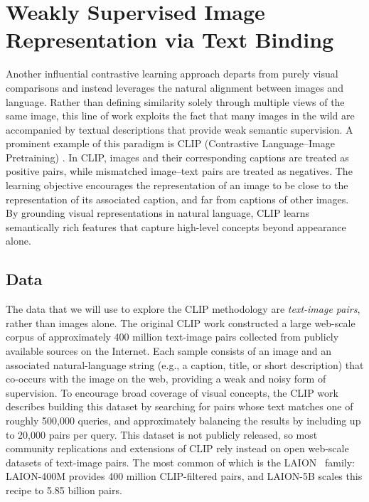 \documentclass[../../book-main.tex]{subfiles}
\begin{document}
\section{Weakly Supervised Image Representation via Text
Binding}\label{sec:CLIP}

Another influential contrastive learning approach departs from purely
visual comparisons and instead leverages the natural alignment
between images and language. Rather than defining similarity solely
through multiple views of the same image, this line of work exploits
the fact that many images in the wild are accompanied by textual
descriptions that provide weak semantic supervision. A prominent
example of this paradigm is CLIP (Contrastive Language–Image
Pretraining) \citep{Radford2021-ir}. In CLIP, images and their
corresponding captions are treated as positive pairs, while
mismatched image–text pairs are treated as negatives. The learning
objective encourages the representation of an image to be close to
the representation of its associated caption, and far from captions
of other images. By grounding visual representations in natural
language, CLIP learns semantically rich features that capture
high-level concepts beyond appearance alone.

\subsection{Data}

The data that we will use to explore the CLIP methodology are {\em
text-image pairs}, rather than images alone. The original CLIP work
constructed a large web-scale corpus of approximately 400 million
text-image pairs collected from publicly available sources on the
Internet. Each sample consists of an image and an associated
natural-language string (e.g., a caption, title, or short
description) that co-occurs with the image on the web, providing a
weak and noisy form of supervision. To encourage broad coverage of
visual concepts, the CLIP work describes building this dataset by
searching for pairs whose text matches one of roughly 500{,}000
queries, and approximately balancing the results by including up to
20{,}000 pairs per query. This dataset is not publicly released, so
most community replications and extensions of CLIP rely instead on
open web-scale datasets of text-image pairs. The most common of which
is the LAION~\citep{schuhmann2022laion5bopenlargescaledataset}
family: LAION-400M provides 400 million CLIP-filtered pairs, and
LAION-5B scales this recipe to 5.85 billion pairs.
\end{document}
